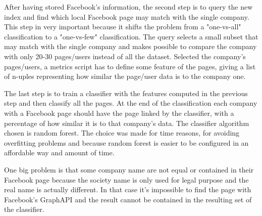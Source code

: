 After having stored Facebook's information, the second step is to query the new index and find which local Facebook page may match with the single company. This step in very important because it shifts the problem from a "one-vs-all" classification to a "one-vs-few" classification. The query selects a small subset that may match with the single company and makes possible to compare the company with only 20-30 pages/users instead of all the dataset.
Selected the company's pages/users, a metrics script has to define some feature of the pages, giving a list of n-uples representing how similar the page/user data is to the company one.

The last step is to train a classifier with the features computed in the previous step and then classify all the pages. At the end of the classification each company with a Facebook page should have the page linked by the classifier, with a percentage of how similar it is to that company's data.
The classifier algorithm chosen is random forest. The choice was made for time reasons, for avoiding overfitting problems and because random forest is easier to be configured in an affordable way and amount of time.

One big problem is that some company name are not equal or contained in their Facebook page because the society name is only used for legal purpose and the real name is actually different. In that case it's impossible to find the page with Facebook's GraphAPI and the result cannot be contained in the resulting set of the classifier.
